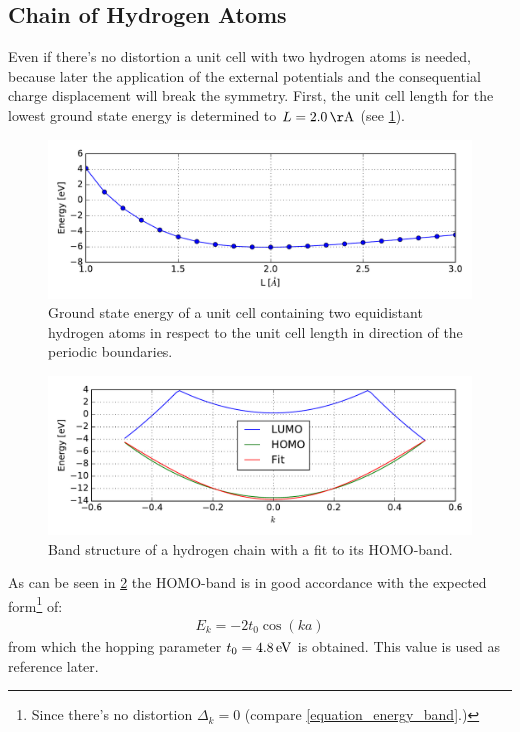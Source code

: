 \subsection{Chain of Hydrogen Atoms}
Even if there's no distortion a unit cell with two hydrogen atoms is needed, because later the application of the external potentials and the consequential charge displacement will break the symmetry. First, the unit cell length for the lowest ground state energy is determined to $L = \unit[2.0]{\AA}$ (see \cref{image_hydrogen_unit_cell_length}).
\begin{figure}
	\centering
	\includegraphics[width = 13cm]{Images/Hydrogen/convergence/hydrogen_length}
	\caption{Ground state energy of a unit cell containing two equidistant hydrogen atoms in respect to the unit cell length in direction of the periodic boundaries.}
	\label{image_hydrogen_unit_cell_length}
\end{figure}
\begin{figure}
	\centering
	\includegraphics[width = 13cm]{Images/Hydrogen/bands/hydrogen_band_structure}
	\caption{Band structure of a hydrogen chain with a fit to its HOMO-band.}
	\label{image_hydrogen_band_structure}
\end{figure}
As can be seen in \cref{image_hydrogen_band_structure} the HOMO-band is in good accordance with the expected form\footnote{Since there's no distortion $\Delta_k = 0$ (compare \cref{equation_energy_band}.)} of:
\begin{align}
	E_k = -2t_0\cos(ka)
\end{align}
from which the hopping parameter $t_0 = \unit[4.8]{eV}$ is obtained. This value is used as reference later.\\
